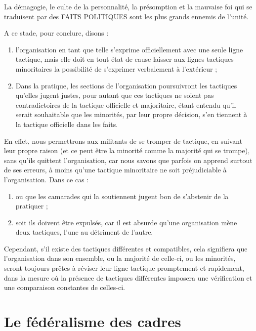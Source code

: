 La démagogie, le culte de la personnalité, la présomption et la mauvaise foi qui se traduisent par des FAITS POLITIQUES sont les plus grands ennemis de l'unité.

A ce stade, pour conclure, disons :

\begin{enumerate}
\item{} l'organisation en tant que telle s'exprime officiellement avec une seule ligne tactique, mais elle doit en tout état de cause laisser aux lignes tactiques minoritaires la possibilité de s'exprimer verbalement à l'extérieur ;
\item{} Dans la pratique, les sections de l'organisation poursuivront les tactiques qu'elles jugent justes, pour autant que ces tactiques ne soient pas contradictoires de la tactique officielle et majoritaire, étant entendu qu'il serait souhaitable que les minorités, par leur propre décision, s'en tiennent à la tactique officielle dans les faits.
\end{enumerate}

En effet, nous permettrons aux militants de se tromper de tactique, en suivant leur propre raison (et ce peut être la minorité comme la majorité qui se trompe), sans qu'ils quittent l'organisation, car nous savons que parfois on apprend surtout de ses erreurs, à moins qu'une tactique minoritaire ne soit préjudiciable à l'organisation. Dans ce cas :

\begin{enumerate}
\item{} ou que les camarades qui la soutiennent jugent bon de s'abstenir de la pratiquer ;
\item{} soit ils doivent être expulsés, car il est absurde qu'une organisation mène deux tactiques, l'une au détriment de l'autre.
\end{enumerate}

Cependant, s'il existe des tactiques différentes et compatibles, cela signifiera que l'organisation dans son ensemble, ou la majorité de celle-ci, ou les minorités, seront toujours prêtes à réviser leur ligne tactique promptement et rapidement, dans la mesure où la présence de tactiques différentes imposera une vérification et une comparaison constantes de celles-ci.

\section{Le fédéralisme des cadres}\hypertarget{le-fdralisme-des-cadres}{}\label{le-fdralisme-des-cadres}

